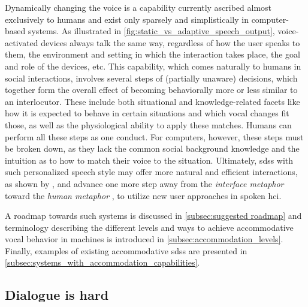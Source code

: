 Dynamically changing the voice is a capability currently ascribed almost exclusively to humans and exist only sparsely and simplistically in computer-based systems.
As illustrated in \cref{fig:static_vs_adaptive_speech_output}, voice-activated devices always talk the same way, regardless of how the user speaks to them, the environment and setting in which the interaction takes place, the goal and role of the devices, etc.
This capability, which comes naturally to humans in social interactions, involves several steps of (partially unaware) decisions, which together form the overall effect of becoming behaviorally more or less similar to an interlocutor.
These include both situational and knowledge-related facets like how it is expected to behave in certain situations and which vocal changes fit those, as well as the physiological ability to apply these matches.
Humans can perform all these steps as one conduct.
For computers, however, these steps must be broken down, as they lack the common social background knowledge and the intuition as to how to match their voice to the situation.
Ultimately, \Acp{sds} with such personalized speech style may offer more natural and efficient interactions, as shown by \citet{Porzel2006entrainment}, and advance one more step away from the \emph{interface metaphor} \citep{Edlund2006twofaces} toward the \emph{human metaphor} \citep{Carlson2006humanlike}, to utilize new user approaches in spoken \ac{hci}.

A roadmap towards such systems is discussed in \cref{subsec:suggested roadmap} and terminology describing the different levels and ways to achieve accommodative vocal behavior in machines is introduced in \cref{subsec:accommodation_levels}.
Finally, examples of existing accommodative \acp{sds} are presented in \cref{subsec:systems_with_accommodation_capabilities}.

\subsection{Dialogue is hard}
\label{subsec:dialogue_is_hard}

